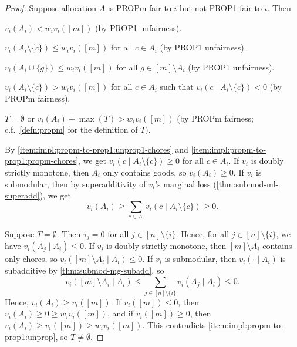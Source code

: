 \begin{proof}
Suppose allocation $A$ is PROPm-fair to $i$ but not PROP1-fair to $i$. Then
\begin{tightenum}
\item\label{item:impl:propm-to-prop1:unprop}$v_i(A_i) < w_iv_i([m])$ (by PROP1 unfairness).
\item\label{item:impl:propm-to-prop1:unprop1-chores}$v_i(A_i \setminus \{c\}) \le w_iv_i([m])$
    for all $c \in A_i$ (by PROP1 unfairness).
\item\label{item:impl:propm-to-prop1:unprop1-goods}$v_i(A_i \cup \{g\}) \le w_iv_i([m])$
    for all $g \in [m] \setminus A_i$ (by PROP1 unfairness).
\item\label{item:impl:propm-to-prop1:propm-chores}$v_i(A_i \setminus \{c\}) > w_iv_i([m])$
    for all $c \in A_i$ such that $v_i(c \mid A_i \setminus \{c\}) < 0$ (by PROPm fairness).
\item\label{item:impl:propm-to-prop1:propm-goods}$T = \emptyset$ or $v_i(A_i) + \max(T) > w_iv_i([m])$
    (by PROPm fairness; c.f.~\cref{defn:propm} for the definition of $T$).
\end{tightenum}

By \ref{item:impl:propm-to-prop1:unprop1-chores} and \ref{item:impl:propm-to-prop1:propm-chores},
we get $v_i(c \mid A_i \setminus \{c\}) \ge 0$ for all $c \in A_i$.
If $v_i$ is doubly strictly monotone, then $A_i$ only contains goods, so $v_i(A_i) \ge 0$.
If $v_i$ is submodular, then by superadditivity of $v_i$'s marginal loss (\cref{thm:submod-ml-superadd}), we get
\[ v_i(A_i) \ge \sum_{c \in A_i} v_i(c \mid A_i \setminus \{c\}) \ge 0. \]

Suppose $T = \emptyset$. Then $\tau_j = 0$ for all $j \in [n] \setminus \{i\}$.
Hence, for all $j \in [n] \setminus \{i\}$, we have $v_i(A_j \mid A_i) \le 0$.
If $v_i$ is doubly strictly monotone, then $[m] \setminus A_i$ contains only chores,
so $v_i([m] \setminus A_i \mid A_i) \le 0$. If $v_i$ is submodular, then
$v_i(\cdot \mid A_i)$ is subadditive by \cref{thm:submod-mg-subadd}, so
\[ v_i([m] \setminus A_i \mid A_i)
    \le \sum_{j \in [n] \setminus \{i\}} v_i(A_j \mid A_i) \le 0. \]
Hence, $v_i(A_i) \ge v_i([m])$.
If $v_i([m]) \le 0$, then $v_i(A_i) \ge 0 \ge w_iv_i([m])$,
and if $v_i([m]) \ge 0$, then $v_i(A_i) \ge v_i([m]) \ge w_iv_i([m])$.
This contradicts \ref{item:impl:propm-to-prop1:unprop}, so $T \neq \emptyset$.


\end{proof}
